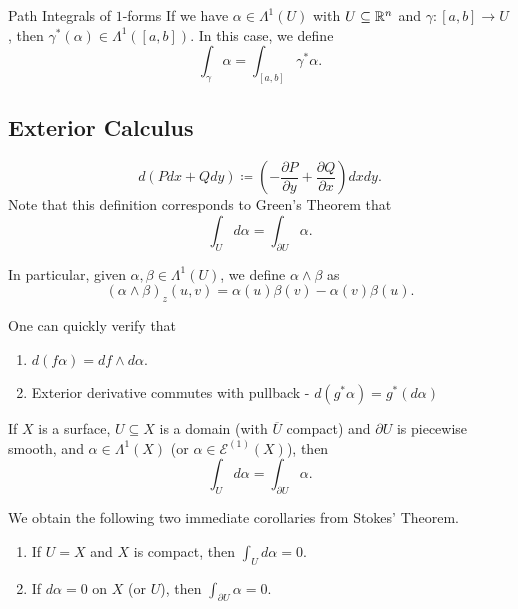\documentclass{article}
\begin{document}
{\begin{definition}{Path Integrals of $1$-forms}
If we have $\alpha \in \Lambda^1(U)$ with $U \subseteq \mathbb{R}^n$ and $\gamma: [a, b] \to U$, then $\gamma^*(\alpha) \in \Lambda^1([a, b])$. In this case, we define
\[\int_{\gamma} \alpha = \int_{[a, b]} \gamma^* \alpha.\]    
\end{definition}

\subsection{Exterior Calculus}
\begin{definition}
    $$d(P dx + Q dy) \coloneqq (-\frac{\partial P}{\partial y} + \frac{\partial Q}{\partial x}) dx dy.$$ Note that this definition corresponds to Green's Theorem that
    \[\int_{U} d\alpha = \int_{\partial U} \alpha.\]
\end{definition}

\begin{definition}
    In particular, given $\alpha, \beta \in \Lambda^1(U)$, we define $\alpha \wedge \beta$ as
    \[(\alpha \wedge \beta)_z(u, v) = \alpha(u) \beta(v) - \alpha(v) \beta(u).\]
\end{definition}

One can quickly verify that
\begin{enumerate}
    \item $d(f \alpha) = df \wedge d\alpha$.
    \item Exterior derivative commutes with pullback - $d(g^* \alpha) = g^*(d\alpha)$
\end{enumerate}

\begin{theorem}
    If $X$ is a surface, $U \subseteq X$ is a domain (with $\overline{U}$ compact) and $\partial U$ is piecewise smooth, and $\alpha \in \Lambda^1(X)$ (or $\alpha \in \mathcal{E}^{(1)}(X)$), then
    \[\int_{U} d\alpha = \int_{\partial U} \alpha.\]
\end{theorem}

We obtain the following two immediate corollaries from Stokes' Theorem.
\begin{corollary}
\begin{enumerate}
    \item If $U = X$ and $X$ is compact, then $\int_{U} d\alpha = 0$.
    \item If $d \alpha = 0$ on $X$ (or $U$), then $\int_{\partial U} \alpha = 0$.
\end{enumerate}
\end{corollary}

}
\end{document}
